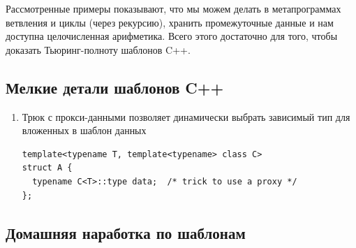 \documentclass[a4paper,12pt,oneside]{article}
\begin{document}
Рассмотренные примеры показывают, что мы можем делать в метапрограммах ветвления и циклы (через рекурсию), хранить промежуточные данные и нам доступна целочисленная арифметика. Всего этого достаточно для того, чтобы доказать Тьюринг-полноту шаблонов C++.

\subsection{Мелкие детали шаблонов C++}

\begin{enumerate}
\item
Трюк с прокси-данными позволяет динамически выбрать зависимый тип для вложенных в шаблон данных

\begin{lstlisting}
template<typename T, template<typename> class C>
struct A {
  typename C<T>::type data;  /* trick to use a proxy */
};
\end{lstlisting}
\end{enumerate}

\pagebreak
\subsection{Домашняя наработка по шаблонам}
\end{document}
